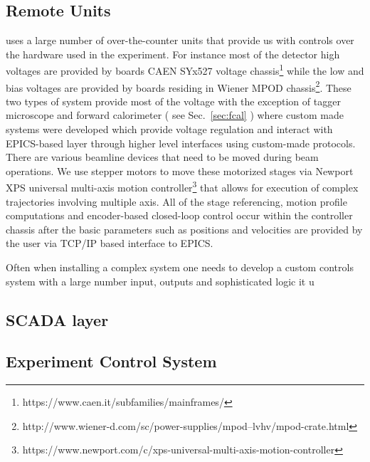 \subsection{Remote Units \label{sec:controlsinterface}}
\gx{} uses a large number of over-the-counter units that provide us with controls over the hardware used in the experiment. For instance most of the detector high voltages are provided by boards CAEN SYx527 voltage chassis\footnote{https://www.caen.it/subfamilies/mainframes/} while the low and bias voltages are provided by boards residing in Wiener MPOD chassis\footnote{http://www.wiener-d.com/sc/power-supplies/mpod--lvhv/mpod-crate.html}. These two types of system provide most of the voltage with the exception of tagger microscope and forward calorimeter ( see Sec.~\ref{sec:fcal} ) where custom made systems were developed which provide voltage regulation and interact with EPICS-based layer through higher level interfaces using custom-made protocols.  
There are various beamline devices that need to be moved during beam operations. We use stepper motors to move these motorized stages via Newport XPS universal multi-axis motion controller\footnote{https://www.newport.com/c/xps-universal-multi-axis-motion-controller} that allows for execution of complex trajectories involving multiple axis. All of the stage referencing, motion profile computations and encoder-based closed-loop control occur within the controller chassis after the basic parameters such as positions and velocities are provided by the user via TCP/IP based interface to EPICS.   

Often when installing a complex system one needs to develop a custom controls system with a large number input, outputs and sophisticated logic it u
\subsection{SCADA layer \label{sec:archiver}}
\subsection{Experiment Control System \label{sec:alarms}}
